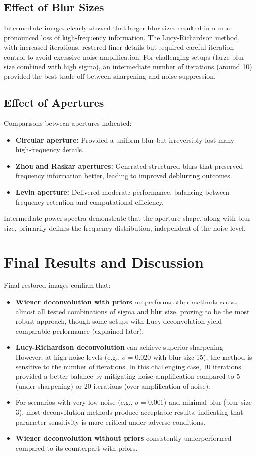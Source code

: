 \documentclass[a4paper,10pt]{article}
\begin{document}
\subsection{Effect of Blur Sizes}
Intermediate images clearly showed that larger blur sizes resulted in a more pronounced
loss of high-frequency information. The Lucy-Richardson method, with increased iterations, 
restored finer details but required careful iteration control to avoid excessive noise amplification.
 For challenging setups (large blur size combined with high sigma), an intermediate number of iterations
  (around 10) provided the best trade-off between sharpening and noise suppression.

\subsection{Effect of Apertures}
Comparisons between apertures indicated:
\begin{itemize}
    \item \textbf{Circular aperture:} Provided a uniform blur but irreversibly lost many high-frequency details.
    \item \textbf{Zhou and Raskar apertures:} Generated structured blurs that preserved frequency information better, leading to improved deblurring outcomes.
    \item \textbf{Levin aperture:} Delivered moderate performance, balancing between frequency retention and computational efficiency.
\end{itemize}
Intermediate power spectra demonstrate that the aperture shape, along with blur size, primarily defines the frequency distribution, independent of the noise level.

\section{Final Results and Discussion}
Final restored images confirm that:
\begin{itemize}
    \item \textbf{Wiener deconvolution with priors} outperforms other methods across almost all tested combinations 
    of sigma and blur size, proving to be the most robust approach, though some setups with Lucy deconvolution 
    yield comparable performance (explained later).
    \item \textbf{Lucy-Richardson deconvolution} can achieve superior sharpening. 
    However, at high noise levels (e.g., $\sigma=0.020$ with blur size 15), 
    the method is sensitive to the number of iterations. In this challenging case, 10 
    iterations provided a better balance by mitigating noise amplification compared 
    to 5 (under-sharpening) or 20 iterations (over-amplification of noise).
    \item For scenarios with very low noise (e.g., $\sigma=0.001$) and minimal blur (blur size 3), most deconvolution methods produce acceptable results, indicating that parameter sensitivity is more critical under adverse conditions.
    \item \textbf{Wiener deconvolution without priors} consistently underperformed compared to its counterpart with priors.
\end{itemize}
\end{document}
